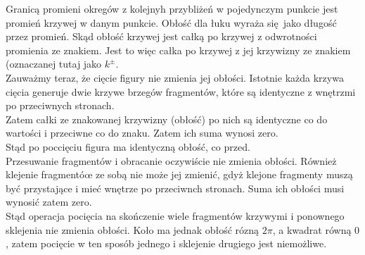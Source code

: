 \documentclass[a4paper, 12pt]{article}
\begin{document}
Granicą promieni okregów z kolejnyh przybliżeń w pojedynczym punkcie jest promień krzywej w danym punkcie.
Obłość dla łuku wyraża się jako długość przez promień. Skąd obłość krzywej jest całką po krzywej z
odwrotności promienia ze znakiem. Jest to więc całka po krzywej z jej krzywizny ze znakiem (oznaczanej
tutaj jako $k^\pm$. \\
Zauważmy teraz, że cięcie figury nie zmienia jej obłości. Istotnie każda krzywa cięcia generuje dwie krzywe
brzegów fragmentów, które są identyczne z wnętrzmi po przeciwnych stronach. \\
Zatem całki ze znakowanej krzywizny (obłość) po nich są identyczne co do wartości i przeciwne co do znaku.
Zatem ich suma wynosi zero. \\
Stąd po poccięciu figura ma identyczną obłość, co przed. \\
Przesuwanie fragmentów i obracanie oczywiście nie zmienia obłości. Również klejenie fragmentóœ ze sobą nie
może jej zmienić, gdyż klejone fragmenty muszą być przystające i mieć wnętrze po przeciwnch stronach. Suma
ich obłości musi wynosić zatem zero. \\
Stąd operacja pocięcia na skończenie wiele fragmentów krzywymi i ponownego sklejenia nie zmienia obłości.
Koło ma jednak obłość rózną $2\pi$, a kwadrat równą $0$, zatem pocięcie w ten sposób jednego i sklejenie
drugiego jest niemożliwe.
\end{document}
